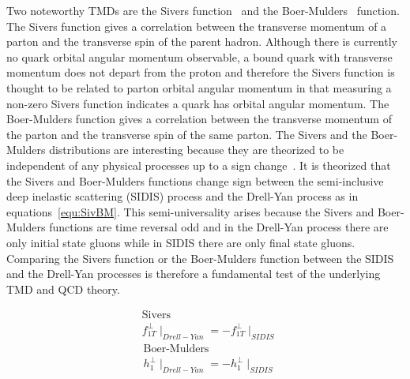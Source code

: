 Two noteworthy TMDs are the Sivers function~\cite{Sivers} and the Boer-Mulders~\cite{Boer-Mulders}
function.  The Sivers function gives a correlation between the
transverse momentum of a parton and the transverse spin of the parent
hadron.  Although there is currently no quark orbital angular momentum
observable, a bound quark with transverse momentum does not depart
from the proton and therefore the Sivers function is thought to be
related to parton orbital angular momentum in that measuring a
non-zero Sivers function indicates a quark has orbital angular
momentum.  The Boer-Mulders function gives a correlation between the
transverse momentum of the parton and the transverse spin of the same
parton.  The Sivers and the Boer-Mulders distributions are interesting
because they are theorized to be independent of any physical processes
up to a sign change~\cite{collins_2002}.  It is theorized that the Sivers and Boer-Mulders
functions change sign between the semi-inclusive deep inelastic
scattering (SIDIS) process and the Drell-Yan process as in
equations~\ref{equ:SivBM}.  This semi-universality arises because the
Sivers and Boer-Mulders functions are time reversal odd and in the
Drell-Yan process there are only initial state gluons while in SIDIS
there are only final state gluons.  Comparing the Sivers function or
the Boer-Mulders function between the SIDIS and the Drell-Yan
processes is therefore a fundamental test of the underlying TMD and QCD theory.



\begin{multicols}{2}
  \begin{equation}
    \begin{aligned}
      & \text{Sivers} \\
      & f^{\perp}_{1T}\mid _{Drell-Yan} = -f^{\perp}_{1T}\mid _{SIDIS} 
    \end{aligned}
  \end{equation}\break
  \begin{equation}
    \begin{aligned}
      & \text{Boer-Mulders} \\
      & h^{\perp}_{1}\mid _{Drell-Yan} = -h^{\perp}_{1}\mid _{SIDIS}
    \end{aligned}
  \end{equation}\break
  \label{equ:SivBM}%
\end{multicols}




